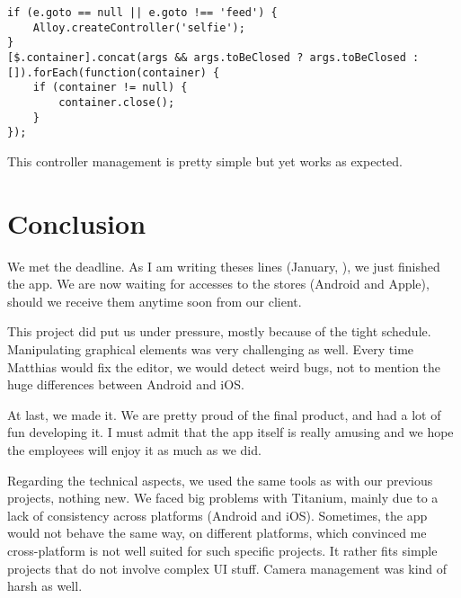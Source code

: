 \begin{lstlisting}
if (e.goto == null || e.goto !== 'feed') {
    Alloy.createController('selfie');
}
[$.container].concat(args && args.toBeClosed ? args.toBeClosed : []).forEach(function(container) {
    if (container != null) {
        container.close();
    }
});
\end{lstlisting}
This controller management is pretty simple but yet works as expected.

\section{Conclusion}

We met the deadline. As I am writing theses lines (January, ), we just finished the app. We are now waiting for accesses to the stores (Android and Apple), should we receive them anytime soon from our client.

\medskip

This project did put us under pressure, mostly because of the tight schedule. Manipulating graphical elements was very challenging as well. Every time Matthias would fix the editor, we would detect weird bugs, not to mention the huge differences between Android and iOS.

At last, we made it. We are pretty proud of the final product, and had a lot of fun developing it. I must admit that the app itself is really amusing and we hope the employees will enjoy it as much as we did.

\medskip

Regarding the technical aspects, we used the same tools as with our previous projects, nothing new. We faced big problems with Titanium, mainly due to a lack of consistency across platforms (Android and iOS). Sometimes, the app would not behave the same way, on different platforms, which convinced me cross-platform is not well suited for such specific projects. It rather fits simple projects that do not involve complex UI stuff. Camera management was kind of harsh as well.